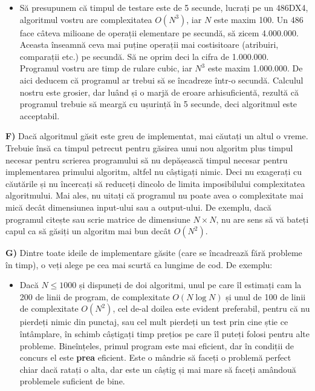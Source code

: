 \begin{itemize}

\item Să presupunem că timpul de testare este de 5 secunde, lucrați pe un
  486DX4, algoritmul vostru are complexitatea $O(N^3)$, iar $N$ este maxim
  100. Un 486 face câteva milioane de operații elementare pe secundă, să zicem
  4.000.000. Aceasta înseamnă ceva mai puține operații mai costisitoare
  (atribuiri, comparații etc.) pe secundă. Să ne oprim deci la cifra de
  1.000.000. Programul vostru are timp de rulare cubic, iar $N^3$ este maxim
  1.000.000. De aici deducem că programul ar trebui să se încadreze într-o
  secundă. Calculul nostru este grosier, dar luând și o marjă de eroare
  arhisuficientă, rezultă că programul trebuie să meargă cu ușurință în 5
  secunde, deci algoritmul este acceptabil.

\end{itemize}

{\bf F)} Dacă algoritmul găsit este greu de implementat, mai căutați un altul
o vreme. Trebuie însă ca timpul petrecut pentru găsirea unui nou algoritm plus
timpul necesar pentru scrierea programului să nu depășească timpul necesar
pentru implementarea primului algoritm, altfel nu câștigați nimic. Deci nu
exagerați cu căutările și nu încercați să reduceți dincolo de limita
imposibilului complexitatea algoritmului. Mai ales, nu uitați că programul nu
poate avea o complexitate mai mică decât dimensiunea input-ului sau a
output-ului. De exemplu, dacă programul citește sau scrie matrice de
dimensiune $N \times N$, nu are sens să vă bateți capul ca să găsiți un
algoritm mai bun decât $O(N^2)$.

{\bf G)} Dintre toate ideile de implementare găsite (care se încadrează fără
probleme în timp), o veți alege pe cea mai scurtă ca lungime de cod. De
exemplu:

\begin{itemize}

\item Dacă $N \leq 1000$ și dispuneți de doi algoritmi, unul pe care îl
  estimați cam la 200 de linii de program, de complexitate $O(N \log N)$ și
  unul de 100 de linii de complexitate $O(N^2)$, cel de-al doilea este evident
  preferabil, pentru că nu pierdeți nimic din punctaj, sau cel mult pierdeți
  un test prin cine știe ce întâmplare, în schimb câștigați timp prețios pe
  care îl puteți folosi pentru alte probleme. Bineînțeles, primul program este
  mai eficient, dar în condiții de concurs el este {\bf prea} eficient. Este o
  mândrie să faceți o problemă perfect chiar dacă ratați o alta, dar este un
  câștig și mai mare să faceți amândouă problemele suficient de bine.

\end{itemize}

